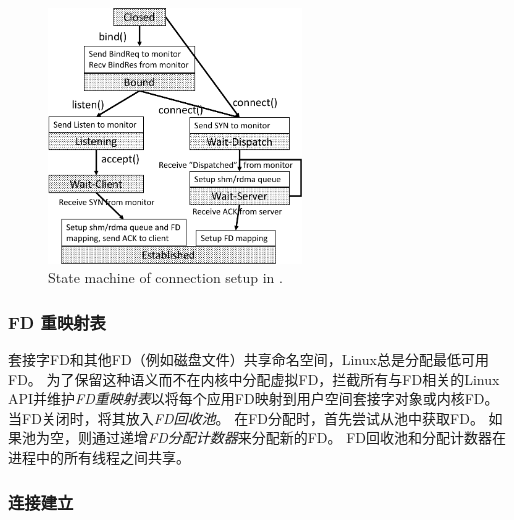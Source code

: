 

\begin{figure}[t!]
	\centering
	\includegraphics[width=0.6\textwidth]{images/conn-setup-new}
	
	\caption{State machine of connection setup in \libipc{}.}
	\label{socksdirect:fig:conn-setup}
\end{figure}


\subsubsection{FD 重映射表}
\label{socksdirect:subsubsec:fd-remapping-table}



套接字FD和其他FD（例如磁盘文件）共享命名空间，Linux总是分配最低可用FD。
为了保留这种语义而不在内核中分配虚拟FD，\libipc {}拦截所有与FD相关的Linux API并维护\emph {FD重映射表}以将每个应用FD映射到用户空间套接字对象或内核FD。
当FD关闭时，\libipc {}将其放入\emph {FD回收池}。
在FD分配时，\libipc {}首先尝试从池中获取FD。
如果池为空，则通过递增\emph {FD分配计数器}来分配新的FD。
FD回收池和分配计数器在进程中的所有线程之间共享。

\subsubsection{连接建立}


